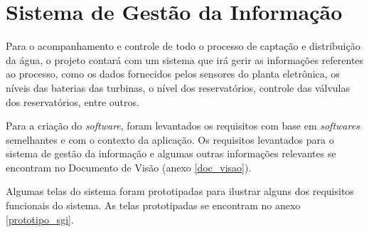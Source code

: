       
    
  \vfill
  \pagebreak
  \section{Sistema de Gestão da Informação}
      
     Para o acompanhamento e controle de todo o processo de captação e distribuição da água, o projeto contará com um sistema 
     que irá gerir as informações referentes ao processo, como os dados fornecidos pelos sensores do planta eletrônica,
     os níveis das baterias das turbinas, o nível dos reservatórios, controle das válvulas dos reservatórios, entre outros.
     
     Para a criação do \textit{software}, foram levantados os requisitos com base em \textit{softwares} semelhantes
     e com o contexto da aplicação. Os requisitos levantados para o sistema de gestão da informação e algumas outras informações
     relevantes se encontram no Documento de Visão (anexo \ref{doc_visao}).
     
     Algumas telas do sistema foram prototipadas para ilustrar alguns dos requisitos funcionais do sistema. As telas prototipadas se 
     encontram no anexo \ref{prototipo_sgi}.
     
     
     